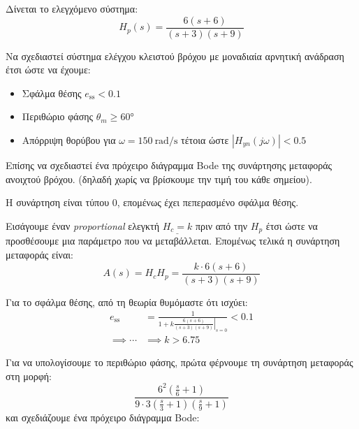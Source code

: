 \documentclass[11pt,a4paper,notitlepage,fleqn]{article}
\begin{document}
\begin{exercise}
Δίνεται το ελεγχόμενο σύστημα:
\[
H_p(s) = \frac{6(s+6)}{(s+3)(s+9)}
\]

Να σχεδιαστεί σύστημα ελέγχου κλειστού βρόχου με μοναδιαία αρνητική ανάδραση έτσι ώστε
να έχουμε:
\begin{itemize}
	\item Σφάλμα θέσης \( e_{\mathrm{ss}} < 0.1 \)
	\item Περιθώριο φάσης \( \theta_m \geq \ang{60} \)
	\item Απόρριψη θορύβου για \( \omega = \SI{150}{\radian/\second} \) τέτοια ώστε
	\( \left|H_{yn}(j\omega )\right| < 0.5 \)
\end{itemize}

Επίσης να σχεδιαστεί ένα πρόχειρο διάγραμμα Bode της συνάρτησης μεταφοράς ανοιχτού βρόχου.
(δηλαδή χωρίς να βρίσκουμε την τιμή του κάθε σημείου).

\tcblower
Η συνάρτηση είναι τύπου 0, επομένως έχει πεπερασμένο σφάλμα θέσης.

Εισάγουμε έναν \textit{proportional} ελεγκτή \( \underline{H_c = k} \) πριν από
την \( H_p \) έτσι ώστε να προσθέσουμε μια παράμετρο που να μεταβάλλεται. Επομένως τελικά
η συνάρτηση μεταφοράς είναι:
\[
A(s) = H_cH_p = \frac{k\cdot 6(s+6)}{(s+3)(s+9)}
\]

Για το σφάλμα θέσης, από τη θεωρία θυμόμαστε ότι ισχύει:
\begin{align*}
	e_{\mathrm{ss}} &= \frac{1}{1+\left.k\frac{6(s+6)}{(s+3)(s+9)}\right|_{s=0}} < 0.1
	\\ \implies \cdots &\implies k > 6.75
\end{align*}

Για να υπολογίσουμε το περιθώριο φάσης, πρώτα φέρνουμε τη συνάρτηση μεταφοράς στη μορφή:
\[
\frac{6^2\left( \frac{s}{6} + 1 \right)}{9\cdot 3 \left( \frac{s}{3}+1 \right)\left(
	\frac{s}{9}+1
	\right)}
\]
και σχεδιάζουμε ένα πρόχειρο διάγραμμα Bode:

\end{exercise}
\end{document}
